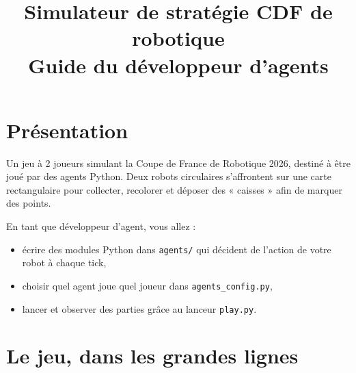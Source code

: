\documentclass[11pt,a4paper]{article}
\title{\textbf{Simulateur de stratégie CDF de robotique}\\[0.3em]\large Guide du développeur d'agents}
\author{}
\date{}
\newcommand{\code}[1]{\texttt{#1}}
\begin{document}
\maketitle
\thispagestyle{empty}

\tableofcontents
\newpage

\section{Présentation}

Un jeu à 2 joueurs simulant la Coupe de France de Robotique 2026, destiné à
être joué par des agents Python. Deux robots circulaires s'affrontent sur une
carte rectangulaire pour collecter, recolorer et déposer des « caisses » afin
de marquer des points.

En tant que développeur d'agent, vous allez :
\begin{itemize}[nosep]
    \item écrire des modules Python dans \code{agents/} qui décident de
          l'action de votre robot à chaque tick,
    \item choisir quel agent joue quel joueur dans \code{agents\_config.py},
    \item lancer et observer des parties grâce au lanceur \code{play.py}.
\end{itemize}

\section{Le jeu, dans les grandes lignes}
\end{document}
